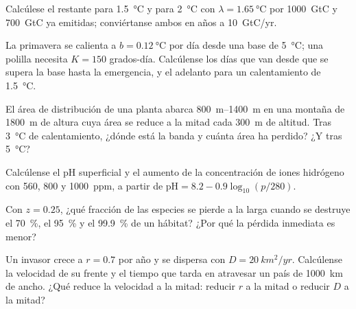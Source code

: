 \begin{exercise}[$\star\star$]\label{exo:b2:global-change:5}
Calcúlese el  restante para \qty{1.5}{\celsius} y
para \qty{2}{\celsius} con $\lambda = \qty{1.65}{\celsius}$ por
\qty{1000}{GtC} y \qty{700}{GtC} ya emitidas; conviértanse ambos en años
a \qty{10}{GtC/yr}.
\end{exercise}

\begin{exercise}[$\star\star$]\label{exo:b2:global-change:6}
La primavera se calienta a $b = \qty{0.12}{\celsius}$ por día desde una
base de \qty{5}{\celsius}; una polilla necesita $K = 150$ grados-día.
Calcúlense los días que van desde que se supera la base hasta la
emergencia, y el adelanto para un calentamiento de \qty{1.5}{\celsius}.
\end{exercise}

\begin{exercise}[$\star\star$]\label{exo:b2:global-change:7}
El área de distribución de una planta abarca \qtyrange{800}{1400}{m} en
una montaña de \qty{1800}{m} de altura cuya área se reduce a la mitad cada
\qty{300}{m} de altitud. Tras \qty{3}{\celsius} de calentamiento, ¿dónde
está la banda y cuánta área ha perdido? ¿Y tras \qty{5}{\celsius}?
\end{exercise}

\begin{exercise}[$\star\star$]\label{exo:b2:global-change:8}
Calcúlense el pH superficial y el aumento de la concentración de iones
hidrógeno con 560, 800 y \qty{1000}{ppm}, a partir de $\mathrm{pH} = 8.2 -
0.9\log_{10}(p/280)$.
\end{exercise}

\begin{exercise}[$\star\star$]\label{exo:b2:global-change:9}
Con $z = 0.25$, ¿qué fracción de las especies se pierde a la larga cuando
se destruye el \qty{70}{\%}, el \qty{95}{\%} y el \qty{99.9}{\%} de un
hábitat? ¿Por qué la pérdida inmediata es menor?
\end{exercise}

\begin{exercise}[$\star\star\star$]\label{exo:b2:global-change:10}
Un invasor crece a $r = 0.7$ por año y se dispersa con $D =
\qty{20}{km^2/yr}$. Calcúlense la velocidad de su frente y el tiempo que
tarda en atravesar un país de \qty{1000}{km} de ancho. ¿Qué reduce la
velocidad a la mitad: reducir $r$ a la mitad o reducir $D$ a la mitad?
\end{exercise}

